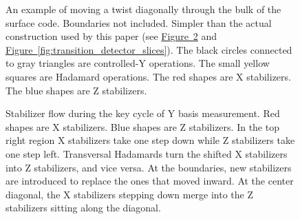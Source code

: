 \documentclass[onecolumn,unpublished,a4paper]{quantumarticle}
\theoremstyle{definition}
\theoremstyle{definition}
\theoremstyle{definition}
\newcommand{\fig}[1]{\hyperref[fig:#1]{Figure~\ref*{fig:#1}}}
\begin{document}
\begin{figure}
    \centering
    \caption{
        An example of moving a twist diagonally through the bulk of the surface code.
        Boundaries not included.
        Simpler than the actual construction used by this paper (see \fig{patch_diagonal_twist} and \fig{transition_detector_slices}).
        The black circles connected to gray triangles are controlled-Y operations.
        The small yellow squares are Hadamard operations.
        The red shapes are X stabilizers.
        The blue shapes are Z stabilizers.
    }
    \label{fig:bulk_diagonal_twist}
\end{figure}

\begin{figure}
    \centering
    \caption{
        Stabilizer flow during the key cycle of Y basis measurement.
        Red shapes are X stabilizers.
        Blue shapes are Z stabilizers.
        In the top right region X stabilizers take one step down while Z stabilizers take one step left.
        Transversal Hadamards turn the shifted X stabilizers into Z stabilizers, and vice versa.
        At the boundaries, new stabilizers are introduced to replace the ones that moved inward.
        At the center diagonal, the X stabilizers stepping down merge into the Z stabilizers sitting along the diagonal.
    }
    \label{fig:patch_diagonal_twist}
\end{figure}
\end{document}

